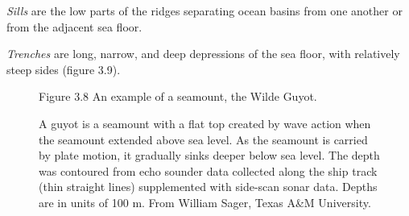 \textit{Sills} are the low parts of the ridges
separating ocean basins from one another or from the adjacent sea
floor.

\textit{Trenches} are long, narrow, and deep
depressions of the sea floor, with relatively steep sides (figure
3.9).

\begin{figure}[t!]
\footnotesize
Figure 3.8 An example of a seamount, the Wilde Guyot.\rule{0pt}{4ex}
A guyot is a seamount with a flat top created by wave action when the
seamount extended above sea level. As the seamount is carried by plate
motion, it gradually sinks deeper below sea level. The depth was
contoured from echo sounder data collected along the ship track (thin
straight lines) supplemented with side-scan sonar data. Depths are in
units of 100 m. From William Sager, Texas A\&M University.
\label{fig:wildeguyot}
\vspace{-3ex}
\end{figure}

